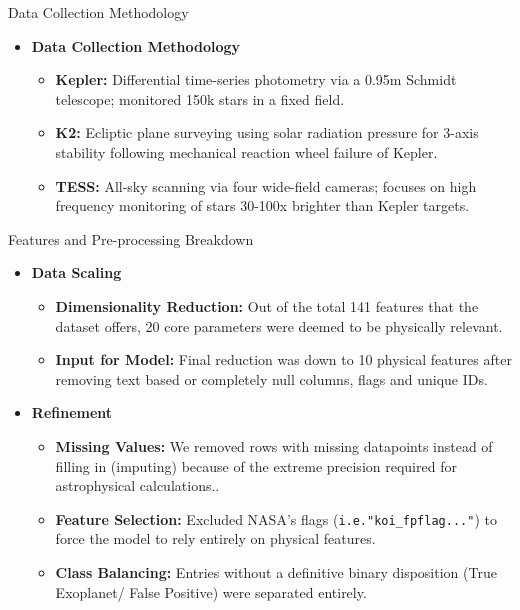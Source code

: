 \documentclass[9pt, aspectratio=169]{beamer}
\begin{document}
\begin{frame}{Data Collection Methodology}
    \begin{itemize}
        \item \textbf{Data Collection Methodology}
        \begin{itemize}
            \item \textbf{Kepler:} Differential time-series photometry via a 0.95m Schmidt telescope; monitored 150k stars in a fixed field.
            \item \textbf{K2:} Ecliptic plane surveying using solar radiation pressure for 3-axis stability following mechanical reaction wheel failure of Kepler.
            \item \textbf{TESS:} All-sky scanning via four wide-field cameras; focuses on high frequency monitoring of stars 30-100x brighter than Kepler targets.
        \end{itemize}
    \end{itemize}
\end{frame}

\begin{frame}{Features and Pre-processing Breakdown}
    \begin{itemize}
        \item \textbf{Data Scaling}
        \begin{itemize}
            \item \textbf{Dimensionality Reduction:} Out of the total 141 features that the dataset offers, 20 core parameters were deemed to be physically relevant.
            \item \textbf{Input for Model:} Final reduction was down to 10 physical features after removing text based or completely null columns, flags and unique IDs.
        \end{itemize}
        \vfill
        \item \textbf{Refinement}
        \begin{itemize}
            \item \textbf{Missing Values:} We removed rows with missing datapoints instead of filling in  (imputing) because of the extreme precision required for astrophysical calculations..
            \item \textbf{Feature Selection:} Excluded NASA's flags (\texttt{i.e."koi\_fpflag..."}) to force the model to rely entirely on physical features.
            \item \textbf{Class Balancing:} Entries without a definitive binary disposition (True Exoplanet/ False Positive) were separated entirely. 
        \end{itemize}
    \end{itemize}
\end{frame}
\end{document}
